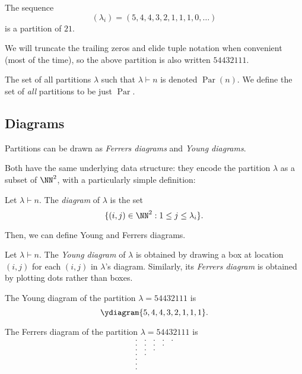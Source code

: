 \documentclass{article}
\DeclareMathOperator{\Par}{Par}
\begin{document}
\begin{example}
    The sequence
    \[
        (\lambda_i) = (5,4,4,3,2,1,1,1,0,\ldots)
    \]
    is a partition of $21$.
\end{example}

We will truncate the trailing zeros and elide tuple notation when convenient (most of the time), so the above partition is also written $54432111$.

The set of all partitions $\lambda$ such that $\lambda \vdash n$ is denoted $\Par(n)$. We define the set of \textit{all} partitions to be just $\Par$.

\subsection{Diagrams}
Partitions can be drawn as \textit{Ferrers diagrams} and \textit{Young diagrams}. 

Both have the same underlying data structure: they encode the partition $\lambda$ as a subset of $\NN^2$, with a particularly simple definition:

\begin{definition}
    Let $\lambda \vdash n$. The \textit{diagram} of $\lambda$ is the set 
    \[
        \{(i,j) \in \NN^2 : 1 \leq j \leq \lambda_i\}.
    \]
\end{definition}

Then, we can define Young and Ferrers diagrams.

\begin{definition}
    Let $\lambda \vdash n$.
    The \textit{Young diagram} of $\lambda$ is obtained by drawing a box at location $(i,j)$ for each $(i,j)$ in $\lambda$'s diagram.
    Similarly, its \textit{Ferrers diagram} is obtained by plotting dots rather than boxes.
\end{definition}
\begin{example}
    The Young diagram of the partition $\lambda = 54432111$ is
    \[
        \ydiagram{5,4,4,3,2,1,1,1}.
    \]
\end{example}
\begin{example}
    The Ferrers diagram of the partition $\lambda = 54432111$ is
    \[
        \begin{matrix}
            . & . & . & . & . \\
            . & . & . & . &  \\
            . & . & . &   &  \\
            . & . &   &   &  \\
            . &   &   &   &  \\
            . &   &   &   &  \\
            . &   &   &   & 
        \end{matrix}
    \]
\end{example}
\end{document}

